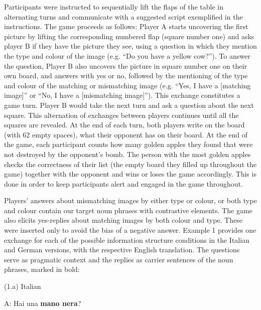\begin{styleStandard}
Participants were instructed to sequentially lift the flaps of the table in alternating turns and communicate with a suggested script exemplified in the instructions. The game proceeds as follows: Player A starts uncovering the first picture by lifting the corresponding numbered flap (square number one) and asks player B if they have the picture they see, using a question in which they mention the type and colour of the image (e.g. “Do you have a yellow cow?”). To answer the question, Player B also uncovers the picture in square number one on their own board, and answers with yes or no, followed by the mentioning of the type and colour of the matching or mismatching image (e.g. “Yes, I have a [matching image]” or “No, I have a [mismatching image]”). This exchange constitutes a game turn. Player B would take the next turn and ask a question about the next square. This alternation of exchanges between players continues until all the squares are revealed. At the end of each turn, both players write on the board (with 62 empty spaces), what their opponent has on their board. At the end of the game, each participant counts how many golden apples they found that were not destroyed by the opponent’s bomb. The person with the most golden apples checks the correctness of their list (the empty board they filled up throughout the game) together with the opponent and wins or loses the game accordingly. This is done in order to keep participants alert and engaged in the game throughout.
\end{styleStandard}

\begin{styleStandard}
Players’ answers about mismatching images by either type or colour, or both type and colour contain our target noun phrases with contrastive elements. The game also elicits yes-replies about matching images by both colour and type. These were inserted only to avoid the bias of a negative answer. Example 1 provides one exchange for each of the possible information structure conditions in the Italian and German versions, with the respective English translation. The questions serve as pragmatic context and the replies as carrier sentences of the noun phrases, marked in bold:
\end{styleStandard}

\begin{styleTextbody}
(1.a) Italian
\end{styleTextbody}

\begin{styleTextbody}
A: Hai una \textbf{mano nera}?
\end{styleTextbody}

